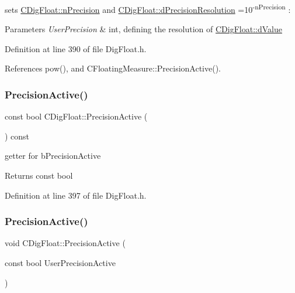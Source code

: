 sets \hyperlink{classCDigFloat_ad580654be35246d14c91482581c0bc11}{C\+Dig\+Float\+::n\+Precision} and \hyperlink{classCDigFloat_a7f9809fa0b25da57f5c8c18a02b7d1a7}{C\+Dig\+Float\+::d\+Precision\+Resolution} =10\textsuperscript{-\/n\+Precision} \+: 


\begin{DoxyParams}{Parameters}
{\em User\+Precision} & int, defining the resolution of \hyperlink{classCDigFloat_a4bbe69e30dd4e20527362493aa9aaf96}{C\+Dig\+Float\+::d\+Value} \\
\hline
\end{DoxyParams}


Definition at line 390 of file Dig\+Float.\+h.



References pow(), and C\+Floating\+Measure\+::\+Precision\+Active().

\mbox{\label{classCDigFloat_a4d6ca24beda280be719374c2a6b2c64d}} 
\subsubsection{\texorpdfstring{Precision\+Active()}{PrecisionActive()}\hspace{0.1cm}{\footnotesize\ttfamily [1/2]}}
{\footnotesize\ttfamily const bool C\+Dig\+Float\+::\+Precision\+Active (\begin{DoxyParamCaption}{ }\end{DoxyParamCaption}) const\hspace{0.3cm}{\ttfamily [inline]}}



getter for b\+Precision\+Active 

\begin{DoxyReturn}{Returns}
const bool 
\end{DoxyReturn}


Definition at line 397 of file Dig\+Float.\+h.

\mbox{\label{classCDigFloat_a680354bead4079c14a67688124bb4b85}} 
\subsubsection{\texorpdfstring{Precision\+Active()}{PrecisionActive()}\hspace{0.1cm}{\footnotesize\ttfamily [2/2]}}
{\footnotesize\ttfamily void C\+Dig\+Float\+::\+Precision\+Active (\begin{DoxyParamCaption}\item[{const bool}]{User\+Precision\+Active }\end{DoxyParamCaption})\hspace{0.3cm}{\ttfamily [inline]}}



